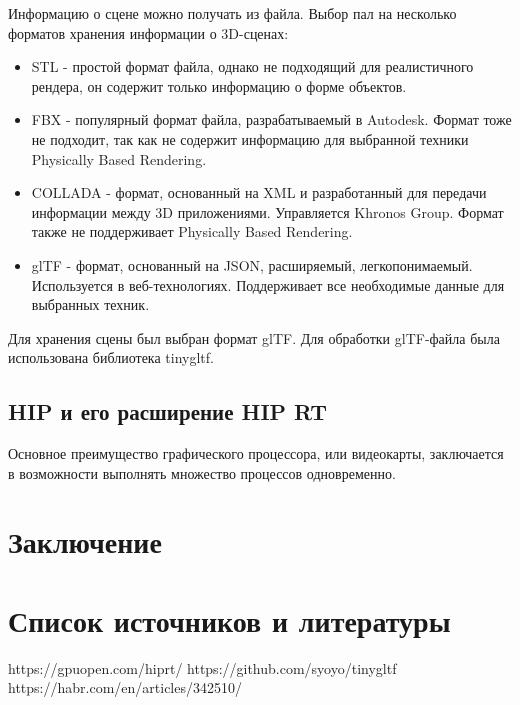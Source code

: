 \documentclass[a4paper,14pt]{extarticle}
\begin{document}
Информацию о сцене можно получать из файла. Выбор пал на несколько форматов хранения информации о 3D-сценах:
\begin{itemize}
    \item STL - простой формат файла, однако не подходящий для реалистичного рендера, он содержит только информацию о форме объектов.
    \item FBX - популярный формат файла, разрабатываемый в Autodesk. Формат тоже не подходит, 
    так как не содержит информацию для выбранной техники Physically Based Rendering.
    \item COLLADA - формат, основанный на XML и разработанный для передачи информации между 3D приложениями. Управляется Khronos Group. 
    Формат также не поддерживает Physically Based Rendering.
    \item glTF - формат, основанный на JSON, расширяемый, легкопонимаемый. Используется в веб-технологиях. 
    Поддерживает все необходимые данные для выбранных техник. 
\end{itemize}

Для хранения сцены был выбран формат glTF. Для обработки glTF-файла была использована библиотека tinygltf. 
\subsection{HIP и его расширение HIP RT}
Основное преимущество графического процессора, или видеокарты, заключается в 
возможности выполнять множество процессов одновременно.  
\section{Заключение}
\section{Список источников и литературы}

https://gpuopen.com/hiprt/
https://github.com/syoyo/tinygltf
https://habr.com/en/articles/342510/
\end{document}
